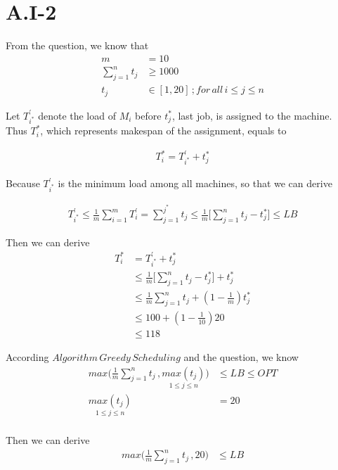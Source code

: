 \section{A.I-2}
\label{sec:approx-1-2}

From the question, we know that
\begin{align*}
m &= 10\\
\sum\limits_{j=1}^n t_j &\ge 1000 \\
t_j  &\in [1,20] \,; for \, all \, i \le j \le n 
\end{align*}

Let $T^{\prime}_{i^*}$ denote the load of $M_i$ before $t_j^*$, last job, is assigned to the machine. \\
Thus $T_i^*$, which represents makespan of the assignment, equals to

\begin{align*}
T_i^* = T^{\prime}_{i^*} + t_j^*
\end{align*}

Because $T^{\prime}_{i^*}$ is the minimum load among all machines, so that we can derive

\begin{align*}
T^{\prime}_{i^*} \le \frac{1}{m}\sum\limits_{i=1}^m T^{\prime}_i = \sum\limits_{j=1}^{j^*} t_j \le \frac{1}{m} \bigg[ \sum\limits_{j=1}^n t_j - t_j^*  \bigg] \le LB
\end{align*}

Then we can derive
\begin{align*}
T_i^* &= T^{\prime}_{i^*} + t_j^* \\
&\le \frac{1}{m} \bigg[ \sum\limits_{j=1}^n t_j - t_j^*  \bigg] + t_j^* \\
&\le \frac{1}{m} \sum\limits_{j=1}^n t_j + ( 1 - \frac{1}{m} ) t_j^* \\
&\le 100 + ( 1 - \frac{1}{10} ) 20 \\
&\le 118
\end{align*}

According $Algorithm\, Greedy\, Scheduling$ and the question, we know
\begin{align*}
max \bigg( \frac{1}{m}\sum\limits_{j=1}^n t_j \, , \underset{1\le j \le n }{max(t_j) }\bigg) &\le LB \le OPT \\
\underset{1\le j \le n }{max(t_j)} &= 20 \\
\end{align*}

Then we can derive
\begin{align*}
max \bigg( \frac{1}{m}\sum\limits_{j=1}^n t_j \, , 20 \bigg) &\le LB
\end{align*}

